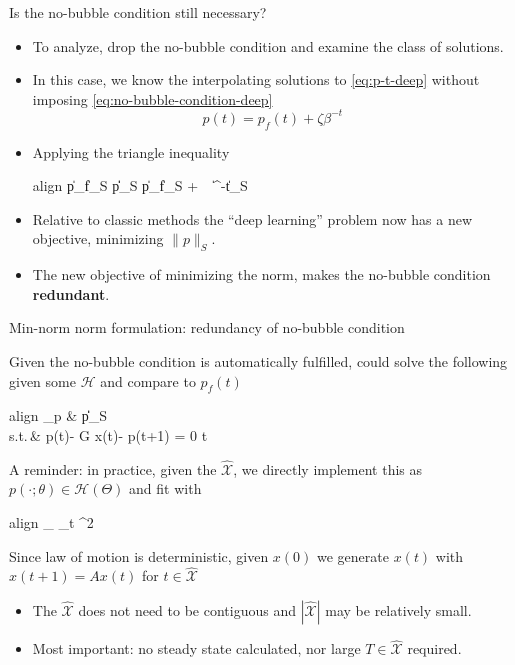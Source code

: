 \documentclass[aspectratio=169,10pt]{beamer}
\newcommand{\emphcolor}[1]{\textbf{\textcolor{emphcolorval}{#1}}}
\newcommand{\Xtrain}{\hat{\mathcal{X}}}
\newcommand{\st}{\textrm{s.t.}\,}
\begin{document}
\begin{frame}{Is the no-bubble condition still necessary?}
	
	\begin{itemize}
		\item To analyze, drop the no-bubble condition and examine the class of solutions. 
		\item In this case, we know the interpolating solutions to \cref{eq:p-t-deep} without imposing \cref{eq:no-bubble-condition-deep}
		\begin{equation}
			p(t) = p_f(t) + \zeta \beta^{-t}%
		\end{equation}
		\item Applying the triangle inequality
		\begin{empheq}[box=\tcbhighmath]{align}
			\|p_f\|_S \leq \|p\|_S \leq \|p_f\|_S + \zeta~ \|\beta^{-t}\|_S\label{eq:asset-pricing-triangle}
		\end{empheq}
		\item Relative to classic methods the ``deep learning'' problem now has a new objective, minimizing $\|p\|_S$.\smallskip
		\medskip
		\item The new objective of minimizing the norm, makes the no-bubble condition \emphcolor{redundant}.
	\end{itemize}
\end{frame}

\begin{frame}[label = asset_seq]{Min-norm norm formulation: redundancy of no-bubble condition}
	
	Given the no-bubble condition is automatically fulfilled, could solve the following given some $\mathcal{H}$ and compare to $p_f(t)$
	\begin{empheq}[box=\tcbhighmath]{align}
		\min_{p \in {}} \quad & \|p\|_S\\
		\st \quad & p(t)- G x(t)- \beta p(t+1) = 0 \quad {} t  \in \Xtrain
	\end{empheq}
	A reminder: in practice, given the $\Xtrain$, we directly implement this as $p(\cdot;\theta) \in \mathcal{H}(\Theta)$ and fit with
	\begin{empheq}[box=\tcbhighmath]{align}
		\min_{\theta \in \Theta} \frac{1}{|\Xtrain|}\sum_{t \in \Xtrain} ^2
	\end{empheq}
	Since law of motion is deterministic, given $x(0)$ we generate $x(t)$ with $x(t+1) = A x(t)$ for $t  \in \Xtrain$
	\begin{itemize}
		\item The $\Xtrain$ does not need to be contiguous and $|\Xtrain|$ may be relatively small.
		\item Most important: no steady state calculated, nor large $T \in \Xtrain$ required.
	\end{itemize}
\end{frame}
\end{document}
